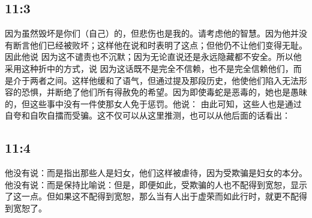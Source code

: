 
\subsection{ 11:3}

\par

因为虽然毁坏是你们（自己）的，但悲伤也是我的。请考虑他的智慧。因为他并没有断言他们已经被败坏；这样他在说和时表明了这点；但他仍不让他们变得无耻。因此他说 因为这不谴责也不沉默；因为无论直说还是永远隐藏都不安全。所以他采用这种折中的方式，说 因为这话既不是完全不信赖，也不是完全信赖他们，而是介于两者之间。这样他缓和了语气，但通过提及那段历史，他使他们陷入无法形容的恐惧，并断绝了他们所有得赦免的希望。因为即使毒蛇是恶毒的，她也是愚昧的，但这些事中没有一件使那女人免于惩罚。他说： 由此可知，这些人也是通过自夸和自吹自擂而受骗。这不仅可以从这里推测，也可以从他后面的话看出：\par


\subsection{ 11:4}

\par

他没有说：而是指出那些人是妇女，他们这样被虐待，因为受欺骗是妇女的本分。他没有说：而是保持比喻说：但是，即便如此，受欺骗的人也不配得到宽恕，显示了这一点。但如果这不配得到宽恕，那么当有人出于虚荣而如此行时，就更不配得到宽恕了。\par

